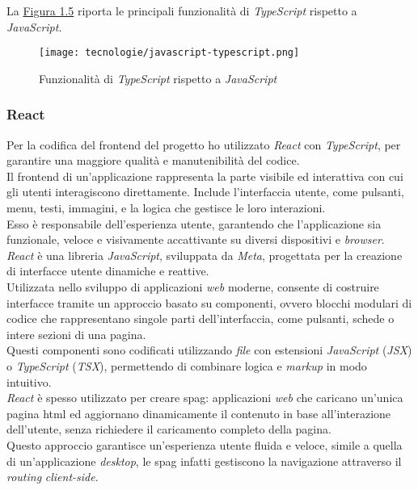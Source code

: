 \noindent La {\hyperref[fig:javacript-typescript]{Figura 1.5}} riporta le principali funzionalità di \textit{TypeScript} rispetto a \textit{JavaScript}.

\begin{figure}[H]
    \label{fig:javacript-typescript}
    \centering
    \texttt{[image: tecnologie/javascript-typescript.png]}
    \caption{Funzionalità di \textit{TypeScript} rispetto a \textit{JavaScript}}
    \cite{site:js-ts}
\end{figure}

\subsubsection{React}

\noindent Per la codifica del \gls{frontend} del progetto ho utilizzato \textit{React} con \textit{TypeScript}, per garantire una maggiore qualità e manutenibilità del codice.\\
Il \gls{frontend} di un’applicazione rappresenta la parte visibile ed interattiva con cui gli utenti interagiscono direttamente.
Include l’interfaccia utente, come pulsanti, menu, testi, immagini, e la logica che gestisce le loro interazioni.\\
Esso è responsabile dell’esperienza utente, garantendo che l’applicazione sia funzionale, veloce e visivamente accattivante su diversi dispositivi e \textit{browser}.\\

\noindent \textit{React} è una libreria \textit{JavaScript}, sviluppata da \textit{Meta}, progettata per la creazione di interfacce utente dinamiche e reattive. \\
Utilizzata nello sviluppo di applicazioni \textit{web} moderne, consente di costruire interfacce tramite un approccio basato su componenti,
ovvero blocchi modulari di codice che rappresentano singole parti dell’interfaccia, come pulsanti, schede o intere sezioni di una pagina.\\
Questi componenti sono codificati utilizzando \textit{file} con estensioni \textit{JavaScript} (\textit{JSX}) o \textit{TypeScript} (\textit{TSX}), permettendo di combinare logica e \textit{markup} in modo intuitivo.\\

\noindent \textit{React} è spesso utilizzato per creare \gls{spag}: applicazioni \textit{web} che caricano un'unica pagina \gls{html} ed aggiornano dinamicamente il contenuto in base all’interazione dell’utente, senza richiedere il caricamento completo della pagina.\\ 
Questo approccio garantisce un’esperienza utente fluida e veloce, simile a quella di un’applicazione \textit{desktop}, le \gls{spag} infatti gestiscono la navigazione attraverso il \textit{routing} \textit{client-side}.\\

